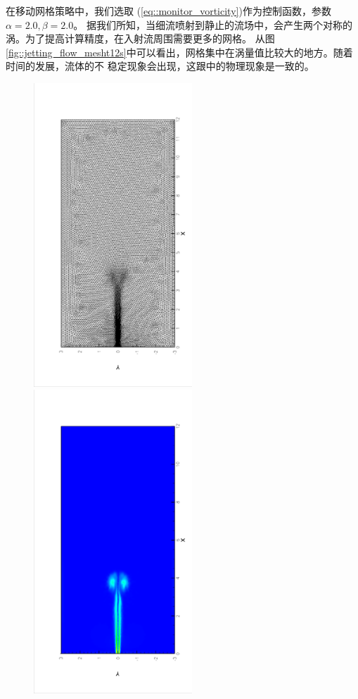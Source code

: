        在移动网格策略中，我们选取 (\ref{eq::monitor_vorticity})作为控制函数，参数$\alpha = 2.0, \beta = 2.0$。
       据我们所知，当细流喷射到静止的流场中，会产生两个对称的涡。为了提高计算精度，在入射流周围需要更多的网格。
       从图\ref{fig::jetting_flow_mesht12s}中可以看出，网格集中在涡量值比较大的地方。随着时间的发展，流体的不
       稳定现象会出现，这跟\cite{milton1982album}中的物理现象是一致的。
       \begin{figure}[!htbp]
         \begin{center}
             \includegraphics[width = 0.53\textwidth, angle = -90]{picture/first/jet_flow_data/mesh_t12s.eps}
             \includegraphics[width = 0.53\textwidth, angle = -90]{picture/first/jet_flow_data/contour_t12s.eps}

\end{center}
\end{figure}
